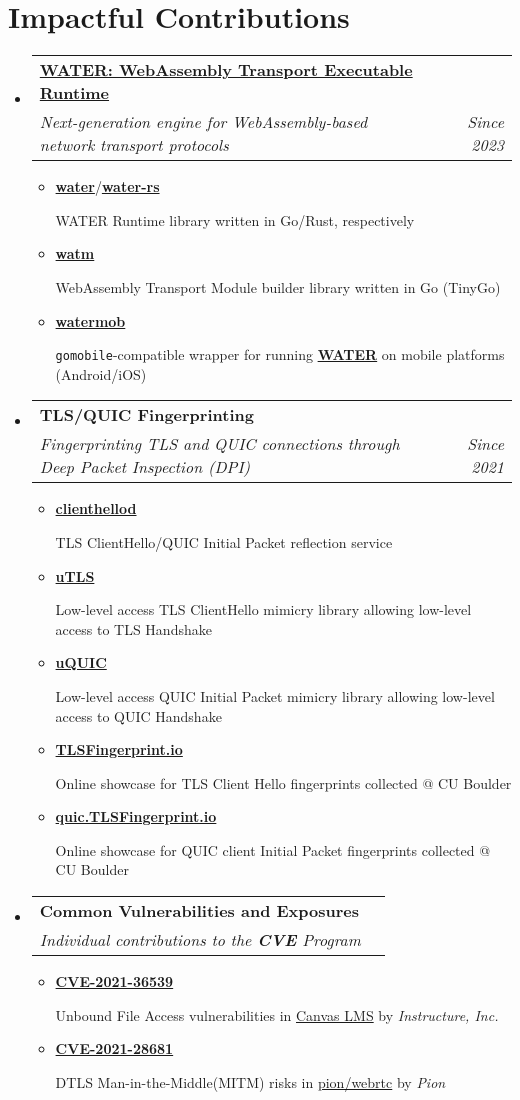 \documentclass[letterpaper,11pt]{article}
\makeatletter
\newcommand{\resumeItem}[1]{
  \item\small{
    {#1 \vspace{-2pt}}
  }
}
\newcommand{\resumeSubheading}[4]{
  \vspace{-2pt}\item
    \begin{tabular*}{0.97\textwidth}[t]{l@{\extracolsep{\fill}}r}
      \textbf{#1} & #2 \\
      \textit{\small#3} & \textit{\small #4} \\
    \end{tabular*}\vspace{-7pt}
}
\newcommand{\resumeSubHeadingListStart}{\begin{itemize}[leftmargin=0.15in, label={}]}
\newcommand{\resumeSubHeadingListEnd}{\end{itemize}}
\newcommand{\resumeItemListStart}{\begin{itemize}}
\newcommand{\resumeItemListEnd}{\end{itemize}\vspace{-5pt}}
\makeatother
\begin{document}
\section{Impactful Contributions}
\resumeSubHeadingListStart
\resumeSubheading
{\href{https://water.refraction.network}{\textbf{WATER: WebAssembly Transport Executable Runtime}}}{\label{sec:water}}
{Next-generation engine for WebAssembly-based network transport protocols}{Since 2023}
\resumeItemListStart
  \resumeItem{\href{https://github.com/refraction-networking/water}{\textbf{water}}/\href{https://github.com/refraction-networking/water-rs}{\textbf{water-rs}}}
    {WATER Runtime library written in Go/Rust, respectively}
  \resumeItem{\href{https://github.com/refraction-networking/watm}{\textbf{watm}}}
    {WebAssembly Transport Module builder library written in Go (TinyGo)}
  \resumeItem{\href{https://github.com/gaukas/watermob}{\textbf{watermob}}}
    {\texttt{gomobile}-compatible wrapper for running \href{https://github.com/refraction-networking/water}{\textbf{WATER}} on mobile platforms (Android/iOS)}
\resumeItemListEnd
\resumeSubheading
{\textbf{TLS/QUIC Fingerprinting}}{}
{Fingerprinting TLS and QUIC connections through Deep Packet Inspection (DPI)}{Since 2021}
\resumeItemListStart
  \resumeItem{\href{https://github.com/gaukas/clienthellod}{\textbf{clienthellod}}}
    {TLS ClientHello/QUIC Initial Packet reflection service}
  \resumeItem{\href{https://github.com/refraction-networking/utls}{\textbf{uTLS}}}
    {Low-level access TLS ClientHello mimicry library allowing low-level access to TLS Handshake}
  \resumeItem{\href{https://github.com/refraction-networking/uquic}{\textbf{uQUIC}}}
    {Low-level access QUIC Initial Packet mimicry library allowing low-level access to QUIC Handshake}
  \resumeItem{\href{https://tlsfingerprint.io}{\textbf{TLSFingerprint.io}}}
    {Online showcase for TLS Client Hello fingerprints collected @ CU Boulder}
  \resumeItem{\href{https://quic.tlsfingerprint.io}{\textbf{quic.TLSFingerprint.io}}}
    {Online showcase for QUIC client Initial Packet fingerprints collected @ CU Boulder}  
\resumeItemListEnd
\resumeSubheading
{\textbf{Common Vulnerabilities and Exposures}}{}
{Individual contributions to the \textbf{CVE\textsuperscript{\textregistered}} Program}{}
\resumeItemListStart
  \resumeItem{\href{https://www.cve.org/CVERecord?id=CVE-2021-36539}{\textbf{CVE-2021-36539}}}
    {Unbound File Access vulnerabilities in \href{https://www.instructure.com/canvas}{Canvas LMS} by \emph{Instructure, Inc.}}
  \resumeItem{\href{https://www.cve.org/CVERecord?id=CVE-2021-28681}{\textbf{CVE-2021-28681}}}
    {DTLS Man-in-the-Middle(MITM) risks in \href{https://github.com/pion/webrtc}{pion/webrtc} by \emph{Pion}}
\resumeItemListEnd
\resumeSubHeadingListEnd
\vspace{1pt}
\end{document}
